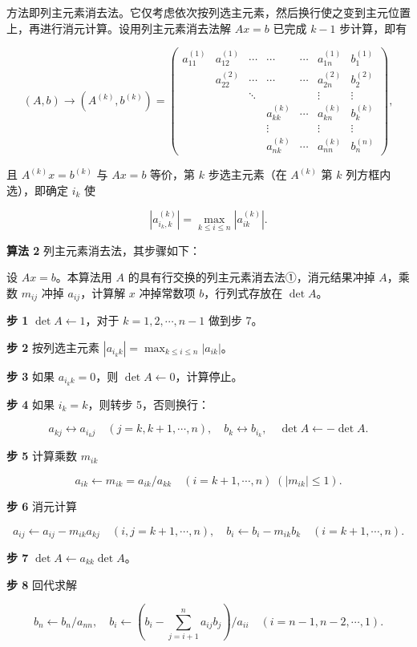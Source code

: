 \documentclass[
  10pt,
  fontset=fandol]{ctexart}
\begin{document}
方法即列主元素消去法。它仅考虑依次按列选主元素，然后换行使之变到主元位置上，再进行消元计算。设用列主元素消去法解 \(Ax=b\) 已完成 \(k-1\) 步计算，即有

\[
(A,b)\to(A^{(k)},b^{(k)})=
\left(\begin{array}{cccccc|c}
a_{11}^{(1)}&a_{12}^{(1)}&\cdots&\cdots&\cdots&a_{1n}^{(1)}&b_1^{(1)}\\
&a_{22}^{(2)}&\cdots&\cdots&\cdots&a_{2n}^{(2)}&b_2^{(2)}\\
&&\ddots&&&\vdots&\vdots\\
&&&a_{kk}^{(k)}&\cdots&a_{kn}^{(k)}&b_k^{(k)}\\
&&&\vdots&&\vdots&\vdots\\
&&&a_{nk}^{(k)}&\cdots&a_{nn}^{(k)}&b_n^{(n)}
\end{array}\right),
\]

且 \(A^{(k)}x=b^{(k)}\) 与 \(Ax=b\) 等价，第 \(k\) 步选主元素（在 \(A^{(k)}\) 第 \(k\) 列方框内选），即确定 \(i_k\) 使

\[|a_{i_k,k}^{(k)}|=\max_{k\le i\le n}|a_{ik}^{(k)}|.\]

\textbf{算法 2} 列主元素消去法，其步骤如下：

设 \(Ax=b\)。本算法用 \(A\) 的具有行交换的列主元素消去法①，消元结果冲掉 \(A\)，乘数 \(m_{ij}\) 冲掉 \(a_{ij}\)，计算解 \(x\) 冲掉常数项 \(b\)，行列式存放在 \(\det A\)。

\textbf{步 1} \(\det A\leftarrow1\)，对于 \(k=1,2,\cdots,n-1\) 做到步 7。

\textbf{步 2} 按列选主元素 \(|a_{i_kk}|=\max_{k\le i\le n}|a_{ik}|\)。

\textbf{步 3} 如果 \(a_{i_kk}=0\)，则 \(\det A\leftarrow0\)，计算停止。

\textbf{步 4} 如果 \(i_k=k\)，则转步 5，否则换行：

\[a_{kj}\leftrightarrow a_{i_kj}\quad(j=k,k+1,\cdots,n),\quad b_k\leftrightarrow b_{i_k},\quad \det A\leftarrow-\det A.\]

\textbf{步 5} 计算乘数 \(m_{ik}\)

\[a_{ik}\leftarrow m_{ik}=a_{ik}/a_{kk}\quad(i=k+1,\cdots,n)\;(|m_{ik}|\le1).\]

\textbf{步 6} 消元计算

\[a_{ij}\leftarrow a_{ij}-m_{ik}a_{kj}\quad(i,j=k+1,\cdots,n),\quad b_i\leftarrow b_i-m_{ik}b_k\quad(i=k+1,\cdots,n).\]

\textbf{步 7} \(\det A\leftarrow a_{kk}\det A\)。

\textbf{步 8} 回代求解

\[b_n\leftarrow b_n/a_{nn},\quad b_i\leftarrow\left(b_i-\sum_{j=i+1}^{n}a_{ij}b_j\right)/a_{ii}\quad(i=n-1,n-2,\cdots,1).\]
\end{document}
